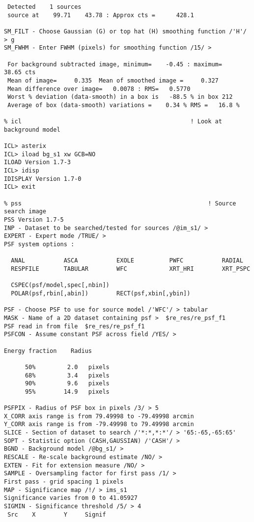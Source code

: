 \begin{small}
\begin{verbatim}
 Detected    1 sources
 source at    99.71    43.78 : Approx cts =      428.1

SM_FILT - Choose Gaussian (G) or top hat (H) smoothing function /'H'/ > g
SM_FWHM - Enter FWHM (pixels) for smoothing function /15/ > 

 For background subtracted image, minimum=    -0.45 : maximum=    38.65 cts
 Mean of image=     0.335  Mean of smoothed image =     0.327
 Mean difference over image=   0.0078 : RMS=   0.5770
 Worst % deviation (data-smooth) in a box is   -88.5 % in box 212
 Average of box (data-smooth) variations =    0.34 % RMS =   16.8 %

% icl                                                ! Look at background model

ICL> asterix
ICL> iload bg_s1 xw GCB=NO
ILOAD Version 1.7-3
ICL> idisp
IDISPLAY Version 1.7-0
ICL> exit

% pss                                                     ! Source search image
PSS Version 1.7-5
INP - Dataset to be searched/tested for sources /@im_s1/ > 
EXPERT - Expert mode /TRUE/ > 
PSF system options :

  ANAL           ASCA           EXOLE          PWFC           RADIAL
  RESPFILE       TABULAR        WFC            XRT_HRI        XRT_PSPC

  CSPEC(psf/model,spec[,nbin])
  POLAR(psf,rbin[,abin])        RECT(psf,xbin[,ybin])

PSF - Choose PSF to use for source model /'WFC'/ > tabular
MASK - Name of a 2D dataset containing psf >  $re_res/re_psf_f1
PSF read in from file  $re_res/re_psf_f1
PSFCON - Assume constant PSF across field /YES/ > 

Energy fraction    Radius

      50%         2.0   pixels
      68%         3.4   pixels
      90%         9.6   pixels
      95%        14.9   pixels

PSFPIX - Radius of PSF box in pixels /3/ > 5
X_CORR axis range is from 79.49998 to -79.49998 arcmin
Y_CORR axis range is from -79.49998 to 79.49998 arcmin
SLICE - Section of dataset to search /'*:*,*:*'/ > '65:-65,-65:65'
SOPT - Statistic option (CASH,GAUSSIAN) /'CASH'/ > 
BGND - Background model /@bg_s1/ > 
RESCALE - Re-scale background estimate /NO/ > 
EXTEN - Fit for extension measure /NO/ > 
SAMPLE - Oversampling factor for first pass /1/ > 
First pass - grid spacing 1 pixels
MAP - Significance map /!/ > ims_s1
Significance varies from 0 to 41.05927
SIGMIN - Significance threshold /5/ > 4
 Src    X        Y     Signif


\end{verbatim}
\end{small}

